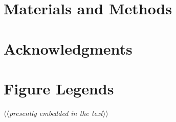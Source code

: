 \documentclass[10pt]{article}
\newcommand{\TODO}[1]{\emph{\small\color{blue}$\langle\langle$#1$\rangle\rangle$}}
\begin{document}
\section*{Materials and Methods}


\section*{Acknowledgments}





\section*{Figure Legends}
\TODO{presently embedded in the text}

\end{document}
